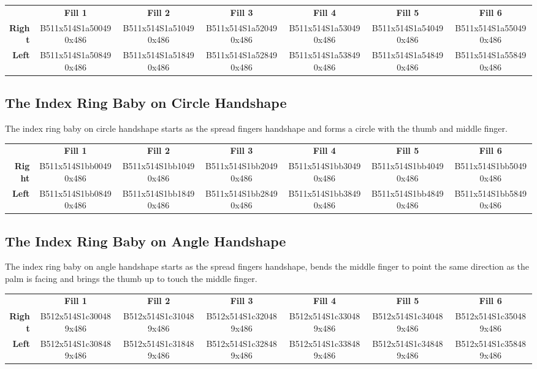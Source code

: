 \documentclass{article}
\begin{document}
\begin{center}
\begin{tabular}{r*{6}{c}}
&\textbf{Fill 1}&\textbf{Fill 2}&\textbf{Fill 3}&\textbf{Fill 4}&\textbf{Fill 5}&\textbf{Fill 6}\\
\textbf{Right}&
B511x514S1a500490x486&
B511x514S1a510490x486&
B511x514S1a520490x486&
B511x514S1a530490x486&
B511x514S1a540490x486&
B511x514S1a550490x486\\
\textbf{Left}&
B511x514S1a508490x486&
B511x514S1a518490x486&
B511x514S1a528490x486&
B511x514S1a538490x486&
B511x514S1a548490x486&
B511x514S1a558490x486\\
\end{tabular}
\end{center}

\subsection{The Index Ring Baby on Circle Handshape}

The index ring baby on circle handshape starts as the spread fingers handshape and forms a circle with the thumb and middle finger.

\begin{center}
\begin{tabular}{r*{6}{c}}
&\textbf{Fill 1}&\textbf{Fill 2}&\textbf{Fill 3}&\textbf{Fill 4}&\textbf{Fill 5}&\textbf{Fill 6}\\
\textbf{Right}&
B511x514S1bb00490x486&
B511x514S1bb10490x486&
B511x514S1bb20490x486&
B511x514S1bb30490x486&
B511x514S1bb40490x486&
B511x514S1bb50490x486\\
\textbf{Left}&
B511x514S1bb08490x486&
B511x514S1bb18490x486&
B511x514S1bb28490x486&
B511x514S1bb38490x486&
B511x514S1bb48490x486&
B511x514S1bb58490x486\\
\end{tabular}
\end{center}

\subsection{The Index Ring Baby on Angle Handshape}

The index ring baby on angle handshape starts as the spread fingers handshape, bends the middle finger to point the same direction as the palm is facing and brings the thumb up to touch the middle finger.

\begin{center}
\begin{tabular}{r*{6}{c}}
&\textbf{Fill 1}&\textbf{Fill 2}&\textbf{Fill 3}&\textbf{Fill 4}&\textbf{Fill 5}&\textbf{Fill 6}\\
\textbf{Right}&
B512x514S1c300489x486&
B512x514S1c310489x486&
B512x514S1c320489x486&
B512x514S1c330489x486&
B512x514S1c340489x486&
B512x514S1c350489x486\\
\textbf{Left}&
B512x514S1c308489x486&
B512x514S1c318489x486&
B512x514S1c328489x486&
B512x514S1c338489x486&
B512x514S1c348489x486&
B512x514S1c358489x486\\
\end{tabular}
\end{center}
\end{document}
